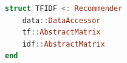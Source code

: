 \begin{lstlisting}[language = Julia]
struct TFIDF <: Recommender
    data::DataAccessor
    tf::AbstractMatrix
    idf::AbstractMatrix
end
\end{lstlisting}

